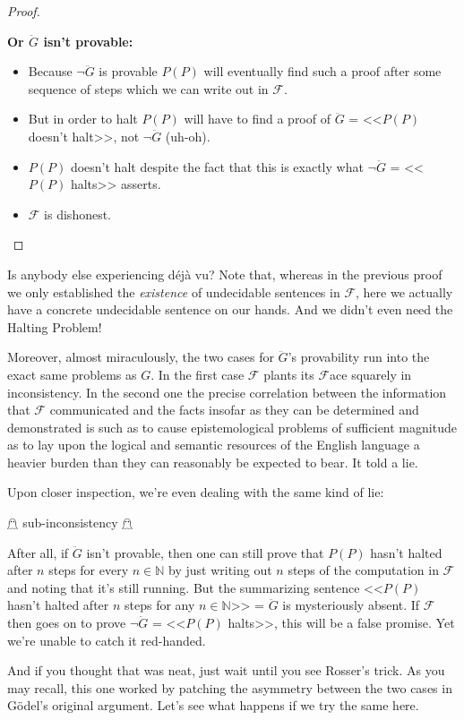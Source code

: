 \documentclass{article}
\theoremstyle{theorem}
\newcommand{\nameditem}[1]{\item\textbf{#1}}
\newcommand{\impl}{\item[$\Rightarrow$]}
\begin{document}
\begin{proof}
\begin{description}
\begin{description}
\nameditem{Or $\ddot{G}$ isn't provable:}
\begin{itemize}
\impl Because $\neg \ddot{G}$ is provable $P(P)$ will eventually find such a proof after some sequence of steps which we can write out in $\mathcal{F}$.
\impl But in order to halt $P(P)$ will have to find a proof of $\ddot{G}$ = <<$P(P)$ doesn't halt>>, not $\neg \ddot{G}$ (uh-oh).
\impl $P(P)$ doesn't halt despite the fact that this is exactly what $\neg \ddot{G}$ = <<$P(P)$ halts>> asserts.
\impl $\mathcal{F}$ is dishonest. \lightning
\end{itemize}
\end{description}
\end{description}
\end{proof}

Is anybody else experiencing déjà vu? Note that, whereas in the previous proof we only established the \textit{existence} of undecidable sentences in $\mathcal{F}$, here we actually have a concrete undecidable sentence on our hands. And we didn't even need the Halting Problem!

Moreover, almost miraculously, the two cases for $\ddot{G}$'s provability run into the exact same problems as $G$. In the first case $\mathcal{F}$ plants its $\mathcal{F}$ace squarely in inconsistency. In the second one the precise correlation between the information that $\mathcal{F}$ communicated and the facts insofar as they can be determined and demonstrated is such as to cause epistemological problems of sufficient magnitude as to lay upon the logical and semantic resources of the English language a heavier burden than they can reasonably be expected to bear. It told a lie.\cite{yes-prime-minister}

Upon closer inspection, we're even dealing with the same kind of lie:
\begin{center}
$\mathghost$ sub-inconsistency $\mathghost$
\end{center}
After all, if $\ddot{G}$ isn't provable, then one can still prove that $P(P)$ hasn't halted after $n$ steps for every $n\in\mathbb{N}$ by just writing out $n$ steps of the computation in $\mathcal{F}$ and noting that it's still running. But the summarizing sentence <<$P(P)$ hasn't halted after $n$ steps for any $n\in\mathbb{N}$>> = $\ddot{G}$ is mysteriously absent. If $\mathcal{F}$ then goes on to prove $\neg \ddot{G}$ = <<$P(P)$ halts>>, this will be a false promise. Yet we're unable to catch it red-handed.

And if you thought that was neat, just wait until you see Rosser's trick. As you may recall, this one worked by patching the asymmetry between the two cases in Gödel's original argument. Let's see what happens if we try the same here.
\end{document}
